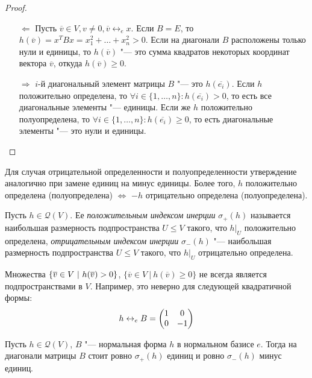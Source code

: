 \begin{proof}~
	\begin{itemize}
		\item[$\Leftarrow$] Пусть $\overline{v} \in V, v \ne 0, \overline{v} \leftrightarrow_e x$. Если $B = E$, то $h(\overline{v}) = x^TBx = x_1^2 + \dots + x_n^2 > 0$. Если на диагонали $B$ расположены только нули и единицы, то $h(\overline{v})$ "--- это сумма квадратов некоторых координат вектора $\overline{v}$, откуда $h(\overline{v}) \ge 0$.
		
		\item[$\Rightarrow$] $i$-й диагональный элемент матрицы $B$ "--- это $h(\overline{e_i})$. Если $h$ положительно определена, то $\forall i \in \{1, \dots, n\}: h(\overline{e_i}) > 0$, то есть все диагональные элементы "--- единицы. \pagebreak Если же $h$ положительно полуопределена, то $\forall i \in \{1, \dots, n\}: h(\overline{e_i}) \ge 0$, то есть диагональные элементы "--- это нули и единицы.\qedhere
	\end{itemize}
\end{proof}

\begin{note}
	Для случая отрицательной определенности и полуопределенности утверждение аналогично при замене единиц на минус единицы. Более того, $h$ положительно определена (полуопределена) $\Leftrightarrow$ $-h$ отрицательно определена (полуопределена).
\end{note}

\begin{definition}
	Пусть $h \in \mathcal{Q}(V)$. Ее \textit{положительным индексом инерции} $\sigma_+(h)$ называется наибольшая размерность подпространства $U \le V$ такого, что $h|_U$ положительно определена, \textit{отрицательным индексом инерции} $\sigma_-(h)$ "--- наибольшая размерность подпространства $U \le V$ такого, что $h|_U$ отрицательно определена.
\end{definition}

\begin{note}
	Множества $\{\overline{v} \in V~|~h(\overline{v}) \hm{>} 0\}$, $\{\overline{v} \in V~|~h(\overline{v}) \ge 0\}$ не всегда является подпространствами в $V$. Например, это неверно для следующей квадратичной формы:
	\[h \leftrightarrow_e B \hm{=} \begin{pmatrix}1&0\\0&-1\end{pmatrix}\]
\end{note}

\begin{theorem}
	Пусть $h \in \mathcal{Q}(V)$, $B$ "--- нормальная форма $h$ в нормальном базисе $e$. Тогда на диагонали матрицы $B$ стоит ровно $\sigma_+(h)$ единиц и ровно $\sigma_-(h)$ минус единиц.
\end{theorem}

